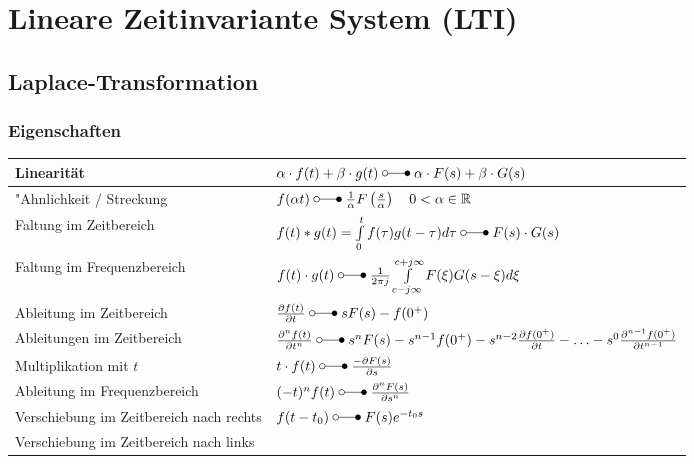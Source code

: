 \section{Lineare Zeitinvariante System (LTI) }
\subsection{Laplace-Transformation }


 	\subsubsection{Eigenschaften }
  		\renewcommand{\arraystretch}{2}
  				\begin{tabular}{|l|l|}
  		        	\hline
  		        	Linearität & 
  		 			$\alpha\cdot f(t) + \beta\cdot g(t) \; \laplace \; \alpha\cdot F(s) + \beta\cdot
  		 			G(s)$ \\
  		 			\hline
  		 			"Ahnlichkeit / Streckung &
  		 			$f(\alpha t) \; \laplace \; \frac{1}{\alpha}F \left (\frac{s}{\alpha} \right ) \quad 0
  		 			<\alpha \in\mathbb{R}$ \\
  		 			\hline
  		 			Faltung im Zeitbereich &
  		 			$f(t) \ast g(t) = \int\limits_{0}^{t} f(\tau)g(t-\tau)d\tau \; \laplace \; F(s)
  		 			\cdot G(s)$\\
  		 			\hline
  		 			Faltung im Frequenzbereich &
  		 			$f(t) \cdot g(t) \; \laplace \; \frac{1}{2\pi j}\int\limits_{c-j\infty}^{c+j\infty}
  		 			F(\xi) G(s-\xi)d\xi$ \\
  		 			\hline
  		 			Ableitung im Zeitbereich &
  		 			$\frac{\partial f(t)}{\partial t} \; \laplace \; sF(s)
  		 			-f(0^+)$ \\
  		 			\hline
  		 			Ableitungen im Zeitbereich &
  		 			$\frac{\partial^n f(t)}{\partial t^n} \; \laplace \; s^nF(s)
  		 			-s^{n-1}f(0^+)-s^{n-2}\frac{\partial f(0^+)}{\partial t}-\ldots
  		 			-s^0\frac{\partial^{n-1} f(0^+)}{\partial t^{n-1}}$ \\
  		 			\hline
  		 			Multiplikation mit $t$ &
  		 			$t\cdot f(t)  \; \laplace \; \frac{-\partial F(s)}{\partial s}$ \\
  		 			\hline
  		 			Ableitung im Frequenzbereich &
  		 			$(-t)^n f(t) \; \laplace \;  \frac{\partial^n F(s)}{\partial s^n}$ \\
  		 			\hline
  		 			Verschiebung im Zeitbereich nach rechts &
  		 			$f(t - t_0) \; \laplace \; F(s)e^{- t_0 s}$ \\
  		 			\hline
  					Verschiebung im Zeitbereich nach links &

\end{tabular}

